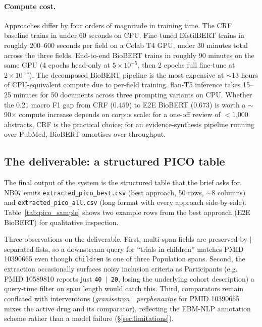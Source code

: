 \documentclass[11pt]{article}
\begin{document}
\paragraph{Compute cost.} Approaches differ by four orders of magnitude
in training time. The CRF baseline trains in under 60 seconds on CPU.
Fine-tuned DistilBERT trains in roughly 200--600 seconds per field on a
Colab T4 GPU, under 30 minutes total across the three fields. End-to-end
BioBERT trains in roughly 90 minutes on the same GPU (4 epochs head-only
at $5\!\times\!10^{-5}$, then 2 epochs full fine-tune at
$2\!\times\!10^{-5}$). The decomposed BioBERT pipeline is the most
expensive at $\sim$13 hours of CPU-equivalent compute due to per-field
training. flan-T5 inference takes 15--25 minutes for 50 documents
across three prompting variants on CPU. Whether the $0.21$ macro F1 gap
from CRF ($0.459$) to E2E BioBERT ($0.673$) is worth a $\sim$90$\times$
compute increase depends on corpus scale: for a one-off review of
$<$1{,}000 abstracts, CRF is the practical choice; for an
evidence-synthesis pipeline running over PubMed, BioBERT amortises over
throughput.

\subsection{The deliverable: a structured PICO table}

The final output of the system is the structured table that the brief
asks for. NB07 emits \texttt{extracted\_pico\_best.csv} (best approach,
50 rows, $\sim$8 columns) and \texttt{extracted\_pico\_all.csv} (long
format with every approach side-by-side). Table~\ref{tab:pico_sample}
shows two example rows from the best approach (E2E BioBERT) for
qualitative inspection.

Three observations on the deliverable. First, multi-span fields are
preserved by $\vert$-separated lists, so a downstream query for
``trials in children'' matches PMID 10390665 even though
\texttt{children} is one of three Population spans. Second, the
extraction occasionally surfaces noisy inclusion criteria as
Participants (e.g. PMID 10589810 reports just \texttt{40 $\vert$ 20},
losing the underlying cohort description) a query-time filter on
span length would catch this. Third, comparators remain conflated with
interventions (\textit{granisetron $\vert$ perphenazine} for PMID
10390665 mixes the active drug and its comparator), reflecting the
EBM-NLP annotation scheme rather than a model failure
(\S\ref{sec:limitations}).
\end{document}
